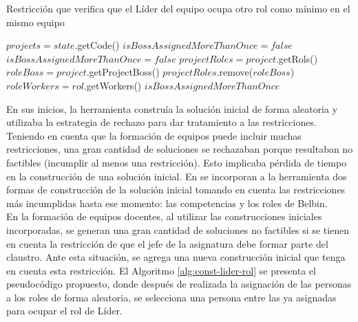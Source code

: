 \begin{algorithm}[H]
	\caption{Restricción que verifica que el Líder del equipo ocupa otro rol como mínimo en el mismo equipo}
	\label{alg:restr-lider-rol}
	$projects = state$.getCode()\;
	$isBossAssignedMoreThanOnce = false$\;
	{
		$isBossAssignedMoreThanOnce = false$\;
		$projectRoles = project$.getRols() 
		$roleBoss = project$.getProjectBoss()\;
		$projectRoles$.remove($roleBoss$)\;
		{
			$roleWorkers = rol$.getWorkers() 
			{
			}
			 \Break
		}
		 \Break
	}
	\Return $isBossAssignedMoreThanOnce$
\end{algorithm} \vspace{1cm}

{\color{red}En sus inicios, la herramienta construía la solución inicial de forma aleatoria y utilizaba la estrategia de rechazo para dar tratamiento a las restricciones. Teniendo en cuenta que la formación de equipos puede incluir muchas restricciones, una gran cantidad de soluciones se rechazaban porque resultaban no factibles (incumplir al menos una restricción). Esto implicaba pérdida de tiempo en la construcción de una solución inicial. En \cite{Duran2019} se incorporan a la herramienta dos formas de construcción de la solución inicial tomando en cuenta las restricciones más incumplidas hasta ese momento: las competencias y los roles de Belbin.}\\

{\color{red}En la formación de equipos docentes, al utilizar las construcciones iniciales incorporadas, se generan una gran cantidad de soluciones no factibles si se tienen en cuenta la restricción de que el jefe de la asignatura debe formar parte del claustro. Ante esta situación, se agrega una nueva construcción inicial que tenga en cuenta esta restricción. El Algoritmo \ref{alg:const-lider-rol} se presenta el pseudocódigo propuesto, donde después de realizada la asignación de las personas a los roles de forma aleatoria, se selecciona una persona entre las ya asignadas para ocupar el rol de Líder.} \\

